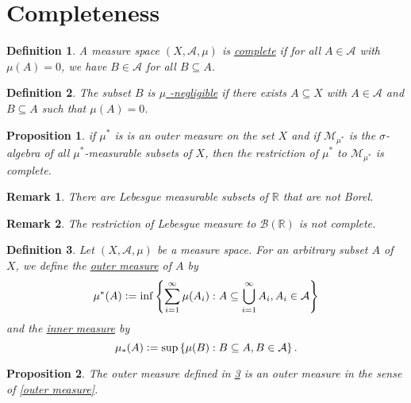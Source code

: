 \documentclass[12pt]{article}
\newtheorem{definition}{Definition}[section]
\newtheorem{proposition}{Proposition}[section]
\newtheorem{remark}{Remark}[section]
\begin{document}
\section{Completeness}
\begin{definition}
	A measure space $(X, \mathcal{A}, \mu)$ is \underline{complete} if for all $A \in \mathcal{A}$ with $\mu(A) = 0$, we have $B \in \mathcal{A}$ for all $B \subseteq A$.
\end{definition}
\begin{definition}
	The subset $B$ is \underline{$\mu$ -negligible} if there exists $A\subseteq X$ with $A \in \mathcal{A}$ and $B \subseteq A$ such that $\mu(A) = 0$.
\end{definition}
\begin{proposition}
	if $\mu^*$ is is an outer measure on the set $X$ and if $\mathcal{M}_{\mu^*}$ is the $\sigma$-algebra of all $\mu^*$-measurable subsets of $X$, then the restriction of $\mu^*$ to $\mathcal{M}_{\mu^*}$ is complete.
\end{proposition}
\begin{remark}
	There are Lebesgue measurable subsets of $\mathbb{R}$ that are not Borel.
\end{remark}
\begin{remark}
	The restriction of Lebesgue measure to $\mathcal{B}(\mathbb{R})$ is not complete.
\end{remark}
\begin{definition}
	\label{subset outer measure}
	Let $(X, \mathcal{A}, \mu)$ be a measure space. For an arbitrary subset $A$ of $X$, we define the \underline{outer measure} of $A$ by
	$$\mu^*(A) \vcentcolon= \inf\left\{\sum_{i=1}^\infty \mu(A_i): A \subseteq \bigcup_{i=1}^\infty A_i, A_i \in \mathcal{A}\right\}$$ and the \underline{inner measure} by
	$$\mu_*(A) \vcentcolon= \sup\left\{\mu(B): B \subseteq A, B \in \mathcal{A}\right\}.$$
\end{definition}

\begin{proposition}
	The outer measure defined in \ref{subset outer measure} is an outer measure in the sense of \ref{outer measure}.
\end{proposition}
\end{document}
